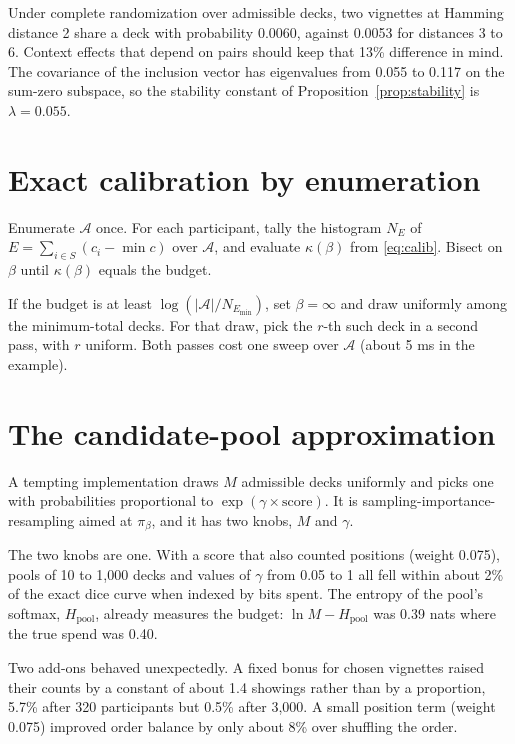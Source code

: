 \documentclass[11pt]{article}
\newcommand{\A}{\mathcal{A}}
\begin{document}
Under complete randomization over admissible decks, two vignettes at Hamming distance 2 share a deck with probability 0.0060, against 0.0053 for distances 3 to 6. Context effects that depend on pairs should keep that 13\% difference in mind. The covariance of the inclusion vector has eigenvalues from 0.055 to 0.117 on the sum-zero subspace, so the stability constant of Proposition~\ref{prop:stability} is $\lambda=0.055$.

\section{Exact calibration by enumeration}\label{app:calib}

Enumerate $\A$ once. For each participant, tally the histogram $N_E$ of $E=\sum_{i\in S}(c_i-\min c)$ over $\A$, and evaluate $\kappa(\beta)$ from \eqref{eq:calib}. Bisect on $\beta$ until $\kappa(\beta)$ equals the budget.

If the budget is at least $\log(|\A|/N_{E_{\min}})$, set $\beta=\infty$ and draw uniformly among the minimum-total decks. For that draw, pick the $r$-th such deck in a second pass, with $r$ uniform. Both passes cost one sweep over $\A$ (about 5 ms in the example).

\section{The candidate-pool approximation}\label{app:pool}

A tempting implementation draws $M$ admissible decks uniformly and picks one with probabilities proportional to $\exp(\gamma\times\text{score})$. It is sampling-importance-resampling \citep{smithgelfand1992} aimed at $\pi_\beta$, and it has two knobs, $M$ and $\gamma$.

The two knobs are one. With a score that also counted positions (weight 0.075), pools of 10 to 1,000 decks and values of $\gamma$ from 0.05 to 1 all fell within about 2\% of the exact dice curve when indexed by bits spent. The entropy of the pool's softmax, $H_{\text{pool}}$, already measures the budget: $\ln M-H_{\text{pool}}$ was 0.39 nats where the true spend was 0.40.

Two add-ons behaved unexpectedly. A fixed bonus for chosen vignettes raised their counts by a constant of about 1.4 showings rather than by a proportion, 5.7\% after 320 participants but 0.5\% after 3,000. A small position term (weight 0.075) improved order balance by only about 8\% over shuffling the order.



\end{document}
